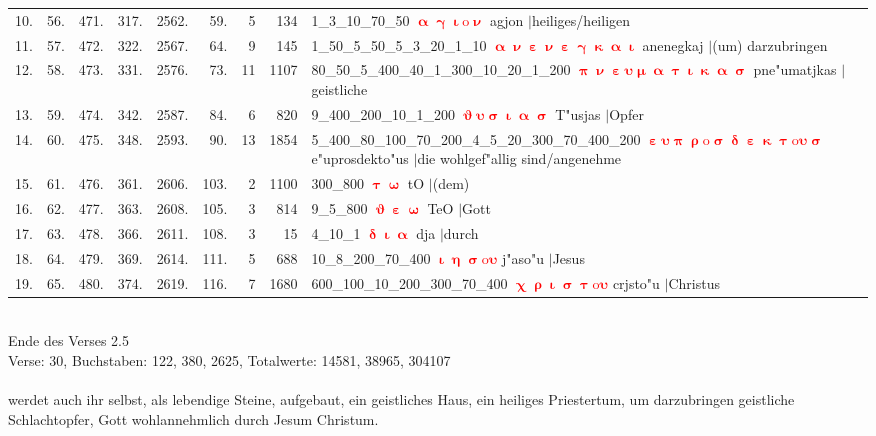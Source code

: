 \documentclass[a4paper,10pt,landscape]{article}
\begin{document}
\begin{tabular}{rrrrrrrrp{120mm}}
10.&56.&471.&317.&2562.&59.&5&134&1\_3\_10\_70\_50 \textcolor{red}{$\boldsymbol{\upalpha\upgamma\upiota\mathrm{o}\upnu}$} agjon $|$heiliges/heiligen\\
11.&57.&472.&322.&2567.&64.&9&145&1\_50\_5\_50\_5\_3\_20\_1\_10 \textcolor{red}{$\boldsymbol{\upalpha\upnu\upepsilon\upnu\upepsilon\upgamma\upkappa\upalpha\upiota}$} anenegkaj $|$(um) darzubringen\\
12.&58.&473.&331.&2576.&73.&11&1107&80\_50\_5\_400\_40\_1\_300\_10\_20\_1\_200 \textcolor{red}{$\boldsymbol{\uppi\upnu\upepsilon\upsilon\upmu\upalpha\uptau\upiota\upkappa\upalpha\upsigma}$} pne"umatjkas $|$geistliche\\
13.&59.&474.&342.&2587.&84.&6&820&9\_400\_200\_10\_1\_200 \textcolor{red}{$\boldsymbol{\upvartheta\upsilon\upsigma\upiota\upalpha\upsigma}$} T"usjas $|$Opfer\\
14.&60.&475.&348.&2593.&90.&13&1854&5\_400\_80\_100\_70\_200\_4\_5\_20\_300\_70\_400\_200 \textcolor{red}{$\boldsymbol{\upepsilon\upsilon\uppi\uprho\mathrm{o}\upsigma\updelta\upepsilon\upkappa\uptau\mathrm{o}\upsilon\upsigma}$} e"uprosdekto"us $|$die wohlgef"allig sind/angenehme\\
15.&61.&476.&361.&2606.&103.&2&1100&300\_800 \textcolor{red}{$\boldsymbol{\uptau\upomega}$} tO $|$(dem)\\
16.&62.&477.&363.&2608.&105.&3&814&9\_5\_800 \textcolor{red}{$\boldsymbol{\upvartheta\upepsilon\upomega}$} TeO $|$Gott\\
17.&63.&478.&366.&2611.&108.&3&15&4\_10\_1 \textcolor{red}{$\boldsymbol{\updelta\upiota\upalpha}$} dja $|$durch\\
18.&64.&479.&369.&2614.&111.&5&688&10\_8\_200\_70\_400 \textcolor{red}{$\boldsymbol{\upiota\upeta\upsigma\mathrm{o}\upsilon}$} j"aso"u $|$Jesus\\
19.&65.&480.&374.&2619.&116.&7&1680&600\_100\_10\_200\_300\_70\_400 \textcolor{red}{$\boldsymbol{\upchi\uprho\upiota\upsigma\uptau\mathrm{o}\upsilon}$} crjsto"u $|$Christus\\
\end{tabular}\medskip \\
Ende des Verses 2.5\\
Verse: 30, Buchstaben: 122, 380, 2625, Totalwerte: 14581, 38965, 304107\\
\\
werdet auch ihr selbst, als lebendige Steine, aufgebaut, ein geistliches Haus, ein heiliges Priestertum, um darzubringen geistliche Schlachtopfer, Gott wohlannehmlich durch Jesum Christum.\\
\end{document}
